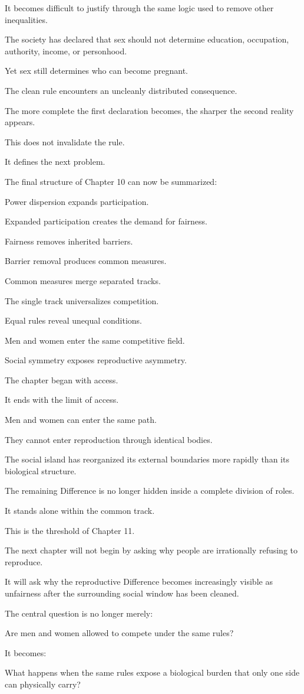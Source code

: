 It becomes difficult to justify through the same logic used to remove other inequalities.

The society has declared that sex should not determine education, occupation, authority, income, or personhood.

Yet sex still determines who can become pregnant.

The clean rule encounters an uncleanly distributed consequence.

The more complete the first declaration becomes, the sharper the second reality appears.

This does not invalidate the rule.

It defines the next problem.

The final structure of Chapter 10 can now be summarized:

Power dispersion expands participation.

Expanded participation creates the demand for fairness.

Fairness removes inherited barriers.

Barrier removal produces common measures.

Common measures merge separated tracks.

The single track universalizes competition.

Equal rules reveal unequal conditions.

Men and women enter the same competitive field.

Social symmetry exposes reproductive asymmetry.

The chapter began with access.

It ends with the limit of access.

Men and women can enter the same path.

They cannot enter reproduction through identical bodies.

The social island has reorganized its external boundaries more rapidly than its biological structure.

The remaining Difference is no longer hidden inside a complete division of roles.

It stands alone within the common track.

This is the threshold of Chapter 11.

The next chapter will not begin by asking why people are irrationally refusing to reproduce.

It will ask why the reproductive Difference becomes increasingly visible as unfairness after the surrounding social window has been cleaned.

The central question is no longer merely:

Are men and women allowed to compete under the same rules?

It becomes:

What happens when the same rules expose a biological burden that only one side can physically carry?